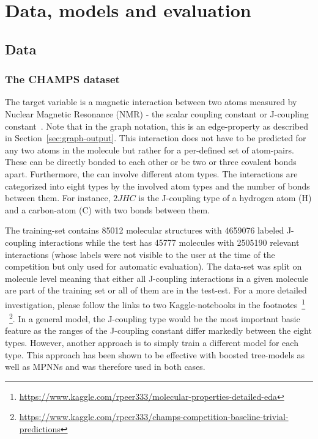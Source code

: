 \chapter{Data, models and evaluation}
\label{chapter:Methods}


\section{Data}
\label{sec:data-and-features}


\subsection{The CHAMPS dataset}
\label{sec:champs-dataset}
	
The target variable is a magnetic interaction between two atoms measured by Nuclear Magnetic Resonance (NMR) - the scalar coupling constant or J-coupling constant~\cite{NMR}.
Note that in the graph notation, this is an edge-property as described in Section~\ref{sec:graph-output}. This interaction does not have to be predicted for any two atoms in the molecule but rather for a per-defined set of atom-pairs. These can be directly bonded to each other or be two or three covalent bonds apart. Furthermore, the can involve different atom types. The interactions are categorized into eight types by the involved atom types and the number of bonds between them. For instance, $2JHC$ is the J-coupling type of a hydrogen atom (H) and a carbon-atom (C) with two bonds between them.

The training-set contains 85012 molecular structures with 4659076 labeled J-coupling interactions while the test has 45777 molecules with 2505190 relevant interactions (whose labels were not visible to the user at the time of the competition but only used for automatic evaluation). The data-set was split on molecule level meaning that either all J-coupling interactions in a given molecule are part of the training set or all of them are in the test-est. For a more detailed investigation, please follow the links to two Kaggle-notebooks in the footnotes~\footnote{\url{https://www.kaggle.com/rpeer333/molecular-properties-detailed-eda}}
~\footnote{\url{https://www.kaggle.com/rpeer333/champs-competition-baseline-trivial-predictions}}.
In a general model, the J-coupling type would be the most important basic feature as the ranges of the J-coupling constant differ markedly between the eight types. However, another approach is to simply train a different model for each type. This approach has been shown to be effective with boosted tree-models as well as MPNNs and was therefore used in both cases.


